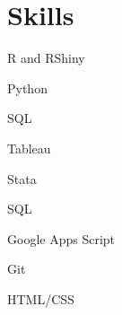 \documentclass[letterpaper,11pt]{article}
\begin{document}
\section{Skills}
\vspace{-1pt}
\begin{itemize}
\small
\begin{minipage}{0.3\linewidth}
    \item R and RShiny
    \item Python
    \item SQL
\end{minipage}
\begin{minipage}{0.025\linewidth}
	\item[\hspace{\fill}]
	\item[\hspace{\fill}]
	\item[\hspace{\fill}]
\end{minipage}
\begin{minipage}{0.3\linewidth}
    \item Tableau
    \item Stata
    \item SQL
\end{minipage}
\begin{minipage}{0.025\linewidth}
	\item[\hspace{\fill}]
	\item[\hspace{\fill}]
	\item[\hspace{\fill}]
\end{minipage}
\begin{minipage}{0.3\linewidth}
	\item Google Apps Script
    \item Git
    \item HTML/CSS
\end{minipage}
\end{itemize}
\end{document}
